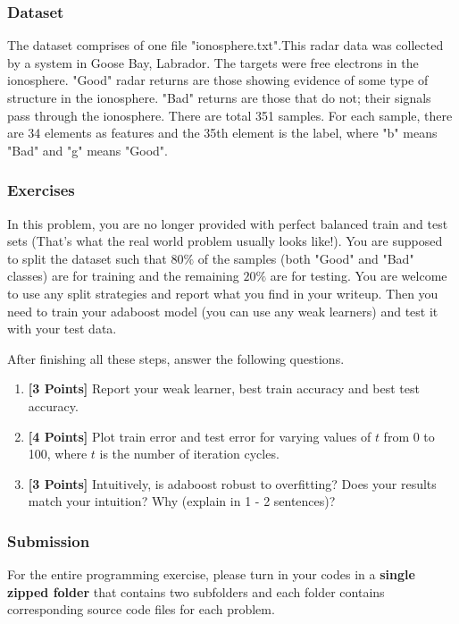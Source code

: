 \documentclass{article}
\begin{document}
\subsubsection*{Dataset}
The dataset comprises of one file "ionosphere.txt".This radar data was collected by a system in Goose Bay, Labrador. The targets were free electrons in the ionosphere. "Good" radar returns are those showing evidence of some type of structure in the ionosphere. "Bad" returns are those that do not; their signals pass through the ionosphere. There are total 351 samples. For each sample, there are 34 elements as features and the 35th element is the label, where "b" means "Bad" and "g" means "Good".

\subsubsection*{Exercises}
In this problem, you are no longer provided with perfect balanced train and test sets (That's what the real world problem usually looks like!). You are supposed to split the dataset such that $80\%$ of the samples (both "Good" and "Bad" classes) are for training and the remaining $20\%$ are for testing. You are welcome to use any split strategies and report what you find in your writeup. Then you need to train your adaboost model (you can use any weak learners) and test it with your test data.

After finishing all these steps, answer the following questions.

\begin{enumerate}
	\item \textbf{[3 Points]} Report your weak learner, best train accuracy and best test accuracy.
	
	\item \textbf{[4 Points]} Plot train error and test error for varying values of $t$ from 0 to 100, where $t$ is the number of iteration cycles. 
	
	\item \textbf{[3 Points]} Intuitively, is adaboost robust to overfitting? Does your results match your intuition? Why (explain in 1 - 2 sentences)?
	
\end{enumerate}

\subsubsection*{Submission}
For the entire programming exercise, please turn in your codes in a \textbf{single zipped folder} that contains two subfolders and each folder contains corresponding source code files for each problem.
\end{document}
